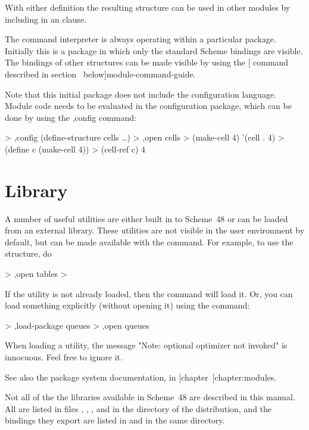 With either definition the resulting structure can be used in other
 modules by including  in an  clause.

The command interpreter is always operating within a particular package.
Initially this is a package in which only the standard Scheme bindings
 are visible.
The bindings of other structures can be made visible by using the 
[ command described in section~\Ref{} below]{module-command-guide}.

Note that this initial package does not include the configuration language.
Module code needs to be evaluated in the configuration package, which can
 be done by using the {\code ,config} command:
\begin{example}
> ,config (define-structure cells \ldots)
> ,open cells
> (make-cell 4)
'(cell . 4)
> (define c (make-cell 4))
> (cell-ref c)
4
\end{example}

\section{Library}

A number of useful utilities are either built in to Scheme~48 or can
be loaded from an external library.  These utilities are not visible
in the user environment by default, but can be made available with the
 command.  For example, to use the  structure, do
\begin{example}
> ,open tables
> 
\end{example}

If the utility is not already loaded, then the  command will
 load it.
Or, you can load something explicitly (without opening it) using the
 command:
\begin{example}
> ,load-package queues
> ,open queues
\end{example}

When loading a utility, the message "Note: optional optimizer not
invoked" is innocuous.  Feel free to ignore it.

See also the package system documentation, in
 [chapter~\Ref]{chapter:modules}.

Not all of the the libraries available in Scheme~48 are described in this
 manual.
All are listed in files ,
 , , and
  in the  directory of the distribution,
 and the bindings they
 export are listed in  and
  in the same directory.

